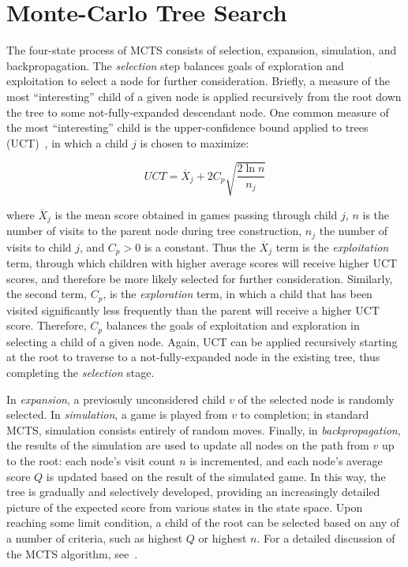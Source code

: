 \documentclass[letterpaper]{article}
\begin{document}
\section{Monte-Carlo Tree Search}

The four-state process of MCTS consists of selection, expansion, simulation, and backpropagation. The {\it selection} step balances goals of exploration and exploitation to select a node for further consideration. Briefly, a measure of the most ``interesting'' child of a given node is applied recursively from the root down the tree to some not-fully-expanded descendant node. One common measure of the most ``interesting'' child is the upper-confidence bound applied to trees (UCT)~\cite{kocsis2006improved}, in which a child $j$ is chosen to maximize:

\begin{equation} \label{eq:UCT}
UCT = \overline{X}_j + 2C_p\sqrt{\frac{2\ln{n}}{n_j}}
\end{equation}

\noindent where $\overline{X}_j$ is the mean score obtained in games passing through child $j$, $n$ is the number of visits to the parent node during tree construction, $n_j$ the number of visits to child $j$, and $C_p > 0$ is a constant. Thus the $\overline{X}_j$ term is the {\it exploitation} term, through which children with higher average scores will receive higher UCT scores, and therefore be more likely selected for further consideration. Similarly, the second term, $C_p$, is the {\it exploration} term, in which a child that has been visited significantly less frequently than the parent will receive a higher UCT score. Therefore, $C_p$ balances the goals of exploitation and exploration in selecting a child of a given node. Again, UCT can be applied recursively starting at the root to traverse to a not-fully-expanded node in the existing tree, thus completing the {\it selection} stage.

In {\it expansion}, a previosuly unconsidered child $v$ of the selected node is randomly selected. In {\it simulation}, a game is played from $v$ to completion; in standard MCTS, simulation consists entirely of random moves. Finally, in {\it backpropagation}, the results of the simulation are used to update all nodes on the path from $v$ up to the root: each node's visit count $n$ is incremented, and each node's average score $Q$ is updated based on the result of the simulated game. In this way, the tree is gradually and selectively developed, providing an increasingly detailed picture of the expected score from various states in the state space. Upon reaching some limit condition, a child of the root can be selected based on any of a number of criteria, such as highest $Q$ or highest $n$. For a detailed discussion of the MCTS algorithm, see~\cite{browne2012survey}.
\end{document}
